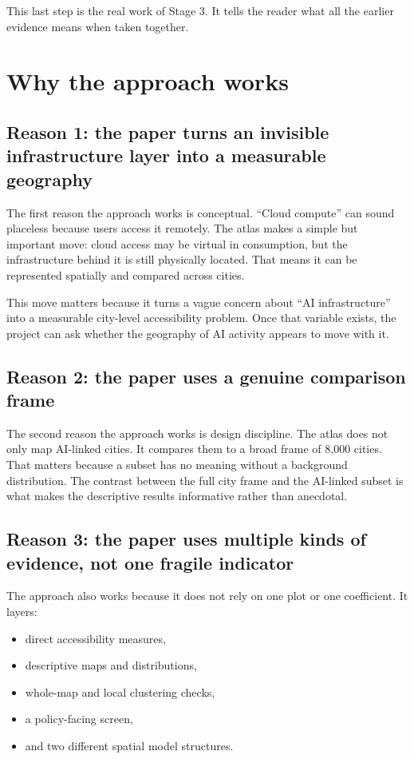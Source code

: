 \documentclass[11pt]{article}
\begin{document}
This last step is the real work of Stage 3. It tells the reader what all the earlier evidence means when taken together.

\section{Why the approach works}
\subsection{Reason 1: the paper turns an invisible infrastructure layer into a measurable geography}
The first reason the approach works is conceptual. ``Cloud compute'' can sound placeless because users access it remotely. The atlas makes a simple but important move: cloud access may be virtual in consumption, but the infrastructure behind it is still physically located. That means it can be represented spatially and compared across cities.

This move matters because it turns a vague concern about ``AI infrastructure'' into a measurable city-level accessibility problem. Once that variable exists, the project can ask whether the geography of AI activity appears to move with it.

\subsection{Reason 2: the paper uses a genuine comparison frame}
The second reason the approach works is design discipline. The atlas does not only map AI-linked cities. It compares them to a broad frame of 8{,}000 cities. That matters because a subset has no meaning without a background distribution. The contrast between the full city frame and the AI-linked subset is what makes the descriptive results informative rather than anecdotal.

\subsection{Reason 3: the paper uses multiple kinds of evidence, not one fragile indicator}
The approach also works because it does not rely on one plot or one coefficient. It layers:
\begin{itemize}[leftmargin=*]
    \item direct accessibility measures,
    \item descriptive maps and distributions,
    \item whole-map and local clustering checks,
    \item a policy-facing screen,
    \item and two different spatial model structures.
\end{itemize}
\end{document}
